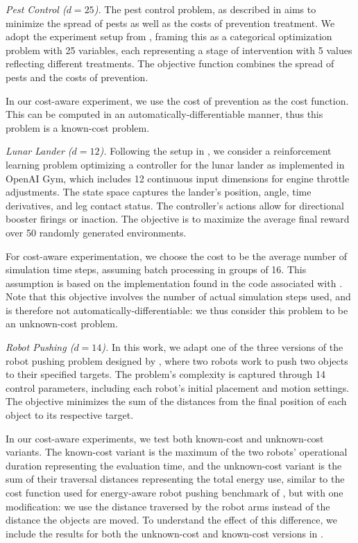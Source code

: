 \documentclass{article}
\begin{document}
\emph{Pest Control ($d = 25$).} 
The pest control problem, as described in \textcite{oh2019combinatorial} aims to minimize the spread of pests as well as the costs of prevention treatment. 
We adopt the experiment setup from \textcite{li2023study}, framing this as a categorical optimization problem with 25 variables, each representing a stage of intervention with 5 values reflecting different treatments. 
The objective function combines the spread of pests and the costs of prevention. 

In our cost-aware experiment, we use the cost of prevention as the cost function.
This can be computed in an automatically-differentiable manner, thus this problem is a known-cost problem.

\emph{Lunar Lander ($d = 12$).} 
Following the setup in \textcite{eriksson2019scalable}, we consider a reinforcement learning problem optimizing a controller for the lunar lander as implemented in OpenAI Gym, which includes 12 continuous input dimensions for engine throttle adjustments.
The state space captures the lander's position, angle, time derivatives, and leg contact status. The controller's actions allow for directional booster firings or inaction.
The objective is to maximize the average final reward over 50 randomly generated environments.

For cost-aware experimentation, we choose the cost to be the average number of simulation time steps, assuming batch processing in groups of 16. This assumption is based on the implementation found in the code associated with \textcite{li2023study}.
Note that this objective involves the number of actual simulation steps used, and is therefore not automatically-differentiable: we thus consider this problem to be an unknown-cost problem.

\emph{Robot Pushing ($d = 14$).} 
In this work, we adapt one of the three versions of the robot pushing problem designed by \textcite{wang2017max}, where two robots work to push two objects to their specified targets. 
The problem's complexity is captured through 14 control parameters, including each robot's initial placement and motion settings. 
The objective minimizes the sum of the distances from the final position of each object to its respective target.

In our cost-aware experiments, we test both known-cost and unknown-cost variants.
The known-cost variant is the maximum of the two robots' operational duration representing the evaluation time, and the unknown-cost variant is the sum of their traversal distances representing the total energy use, similar to the cost function used for energy-aware robot pushing benchmark of \textcite{astudillo2021multi}, but with one modification: we use the distance traversed by the robot arms instead of the distance the objects are moved. 
To understand the effect of this difference, we include the results for both the unknown-cost and known-cost versions in .
\end{document}
